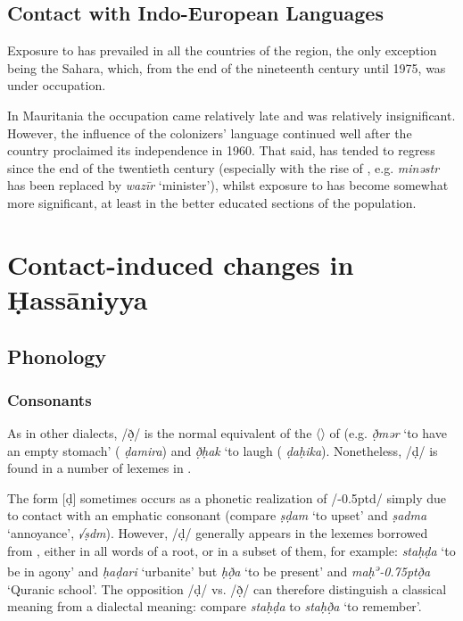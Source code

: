 \documentclass[output=paper]{langsci/langscibook}
\begin{document}
\subsection{Contact with Indo-European Languages} %

Exposure to  has prevailed in all the countries of the region, the only exception being the  Sahara, which, from the end of the nineteenth century until 1975, was under  occupation.

In Mauritania the  occupation came relatively late and was relatively insignificant. However, the influence of the colonizers’ language continued well after the country proclaimed its independence in 1960. That said,  has tended to regress since the end of the twentieth century (especially with the rise of  , e.g. \textit{minəstr} has been replaced by \textit{wazīr} ‘minister’), whilst exposure to  has become somewhat more significant, at least in the better educated sections of the population.

\section{Contact-induced changes in  Ḥassāniyya} %

\subsection{Phonology} %

\subsubsection{Consonants} %
As in other  dialects, /ð̣/ is the normal equivalent of the 〈〉 of   (e.g. \textit{ð̣mər} ‘to have an empty stomach’ ( \textit{ḍamira}) and \textit{ð̣ḥak} ‘to laugh ( \textit{ḍaḥika}). Nonetheless, /ḍ/ is found in a number of lexemes in . 

The form [ḍ] sometimes occurs as a phonetic realization of /\kern -0.5ptd/ simply due to contact with an {emphatic consonant} (compare \textit{ṣḍam} ‘to upset’ and \textit{ṣadma} ‘annoyance’,  \textit{√ṣdm}). However, /ḍ/ generally appears in the lexemes borrowed from  , either in all words of a {root}, or in a subset of them, for example: \textit{staḥḍa{\R}} ‘to be in agony’ and \textit{ḥaḍari} ‘urbanite’ but \textit{ḥð̣a{\R}} ‘to be present’ and \textit{maḥ\textsuperscript{ə}\kern -0.75ptð̣{\R}a} ‘Quranic school’. The opposition /ḍ/ vs. /ð̣/ can therefore distinguish a classical meaning from a dialectal meaning: compare \textit{staḥḍa{\R}} to \textit{staḥð̣a{\R}} ‘to remember’.
\end{document}
